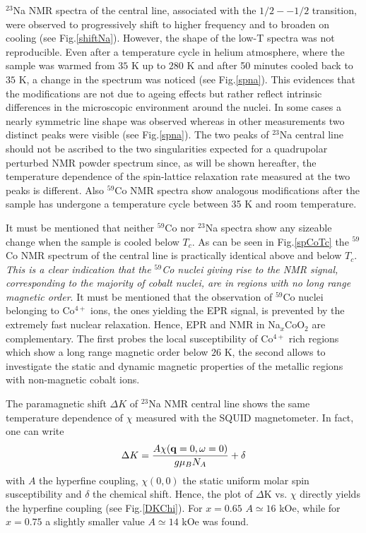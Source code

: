 \documentclass[prb,showpacs,preprintnumbers,amsmath,amssymb,floatfix]{revtex4}
\begin{document}
$^{23}$Na NMR spectra of the central line, associated with the
$1/2 - -1/2$ transition, were observed to progressively shift to
higher frequency and to broaden on cooling (see
Fig.\ref{shiftNa}). However, the shape of the low-T spectra was
not reproducible. Even after a temperature cycle in helium
atmosphere, where the sample was warmed from $35$ K up to $280$ K
and after 50 minutes cooled back to $35$ K, a change in the
spectrum was noticed (see Fig.\ref{spna}). This evidences that the
modifications are not due to ageing effects but rather reflect
intrinsic differences in the microscopic environment around the
nuclei. In some cases a nearly symmetric line shape was observed
whereas in other measurements two distinct peaks were visible
\cite{NMRStall} (see Fig.\ref{spna}). The two peaks of $^{23}$Na
central line should not be ascribed to the two singularities
expected for a quadrupolar perturbed NMR powder spectrum
\cite{Abragam} since, as will be shown hereafter, the temperature
dependence of the spin-lattice relaxation rate measured at the two
peaks is different. Also $^{59}$Co NMR spectra show analogous
modifications after the sample has undergone a temperature cycle
between 35 K and  room temperature.



It must be mentioned that neither $^{59}$Co nor $^{23}$Na spectra
show any sizeable change when the sample is cooled below $T_c$. As
can be seen in Fig.\ref{spCoTc} the $^{59}$Co NMR spectrum of the
central line is practically identical above and below $T_c$.{\it
This is a clear indication that the $^{59}$Co nuclei giving rise
to the NMR signal, corresponding to the majority of cobalt nuclei,
are in regions with no long range magnetic order}. It must be
mentioned that the observation of $^{59}$Co nuclei belonging to
Co$^{4+}$ ions, the ones yielding the EPR signal, is prevented by
the extremely fast nuclear relaxation. Hence, EPR and NMR in
Na$_x$CoO$_2$ are complementary. The first probes the local
susceptibility of Co$^{4+}$ rich regions which show a long range
magnetic order below $26$ K, the second allows to investigate the
static and dynamic magnetic properties of the metallic regions
with non-magnetic cobalt ions.

The paramagnetic shift $\Delta K$ of $^{23}$Na NMR central line
shows the same temperature dependence of $\chi$ measured with the
SQUID magnetometer. In fact, one can write
\begin{equation}
\label{eq:A}
          \Delta K = {A \chi({\bf q}=0,\omega =0)\over g\mu_BN_A} + \delta
\end{equation}
with $A$ the hyperfine coupling, $\chi(0,0)$ the static uniform
molar spin susceptibility and $\delta$ the chemical shift. Hence,
the plot of $\Delta$K vs. $\chi$ directly yields the hyperfine
coupling (see Fig.\ref{DKChi}). For $x=0.65$ $A\simeq 16$ kOe,
while for $x=0.75$ a slightly smaller value $A\simeq 14$ kOe was
found.
\end{document}
